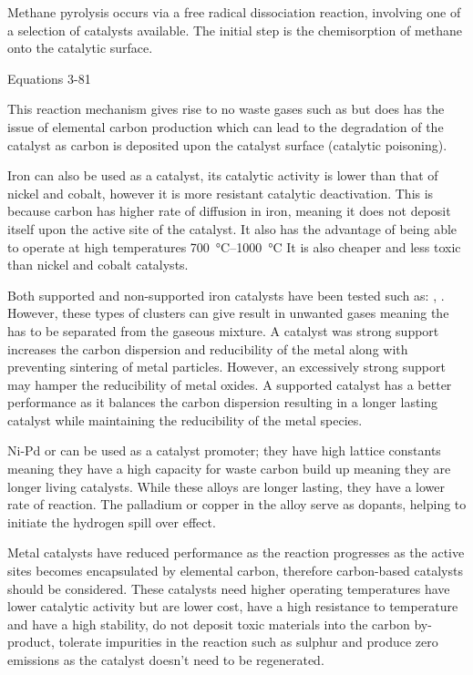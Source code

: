 \begin{multicols}{2}
Methane pyrolysis occurs via a free radical dissociation reaction, involving one of a selection of catalysts available.
The initial step is the chemisorption of methane onto the catalytic surface.

Equations 3-81

This reaction mechanism gives rise to no waste gases such as  but does has the issue of elemental carbon production which can lead to the degradation of the catalyst as carbon is deposited upon the catalyst surface (catalytic poisoning).


Iron can also be used as a catalyst, its catalytic activity is lower than that of nickel and cobalt, however it is more resistant catalytic deactivation.
This is because carbon has higher rate of diffusion in iron, meaning it does not deposit itself upon the active site of the catalyst.
It also has the advantage of being able to operate at high temperatures \SIrange{700}{1000}{\celsius} 
It is also cheaper and less toxic than nickel and cobalt catalysts.

Both supported and non-supported iron catalysts have been tested such as: \ce{[Fe(CO)5]}, \ce{[Fe(cp)2]}.
However, these types of clusters can give result in unwanted gases meaning the  has to be separated from the gaseous mixture.
A catalyst was strong support increases the carbon dispersion and reducibility of the metal along with preventing sintering of metal particles.
However, an excessively strong support may hamper the reducibility of metal oxides.
A supported catalyst has a better performance as it balances the carbon dispersion resulting in a longer lasting catalyst while maintaining the reducibility of the metal species.

Ni-Pd or  can be used as a catalyst promoter; they have high lattice constants meaning they have a high capacity for waste carbon build up meaning they are longer living catalysts.
While these alloys are longer lasting, they have a lower rate of reaction.
The palladium or copper in the alloy serve as dopants, helping to initiate the hydrogen spill over effect.

Metal catalysts have reduced performance as the reaction progresses as the active sites becomes encapsulated by elemental carbon, therefore carbon-based catalysts should be considered.
These catalysts need higher operating temperatures have lower catalytic activity but are lower cost, have a high resistance to temperature and have a high stability, do not deposit toxic materials into the carbon by-product, tolerate impurities in the reaction such as sulphur and produce zero  emissions as the catalyst doesn’t need to be regenerated.


\end{multicols}
